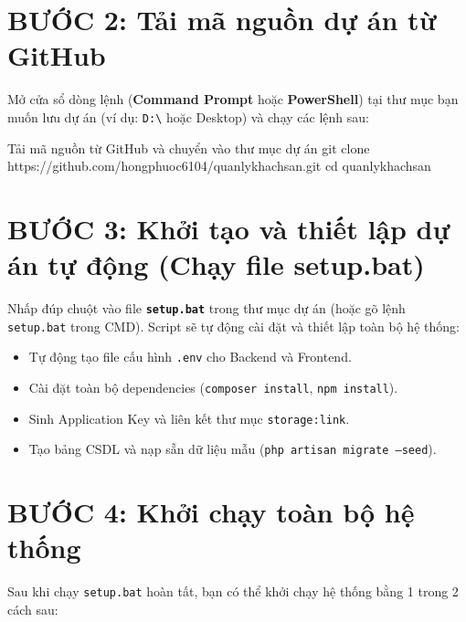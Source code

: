 \documentclass[11pt,a4paper]{article}
\newcommand{\codeinline}[1]{\texttt{#1}}
\begin{document}
\section{BƯỚC 2: Tải mã nguồn dự án từ GitHub}

Mở cửa sổ dòng lệnh (\textbf{Command Prompt} hoặc \textbf{PowerShell}) tại thư mục bạn muốn lưu dự án (ví dụ: \texttt{D:\textbackslash} hoặc Desktop) và chạy các lệnh sau:

\begin{terminalcmd}{Tải mã nguồn từ GitHub và chuyển vào thư mục dự án}
git clone https://github.com/hongphuoc6104/quanlykhachsan.git
cd quanlykhachsan
\end{terminalcmd}

\section{BƯỚC 3: Khởi tạo và thiết lập dự án tự động (Chạy file setup.bat)}

Nhấp đúp chuột vào file \textbf{\texttt{setup.bat}} trong thư mục dự án (hoặc gõ lệnh \codeinline{setup.bat} trong CMD). Script sẽ tự động cài đặt và thiết lập toàn bộ hệ thống:
\begin{itemize}[leftmargin=5mm,itemsep=1.5pt]
  \item Tự động tạo file cấu hình \texttt{.env} cho Backend và Frontend.
  \item Cài đặt toàn bộ dependencies (\texttt{composer install}, \texttt{npm install}).
  \item Sinh Application Key và liên kết thư mục \texttt{storage:link}.
  \item Tạo bảng CSDL và nạp sẵn dữ liệu mẫu (\codeinline{php artisan migrate --seed}).
\end{itemize}

\section{BƯỚC 4: Khởi chạy toàn bộ hệ thống}

Sau khi chạy \texttt{setup.bat} hoàn tất, bạn có thể khởi chạy hệ thống bằng 1 trong 2 cách sau:
\end{document}
